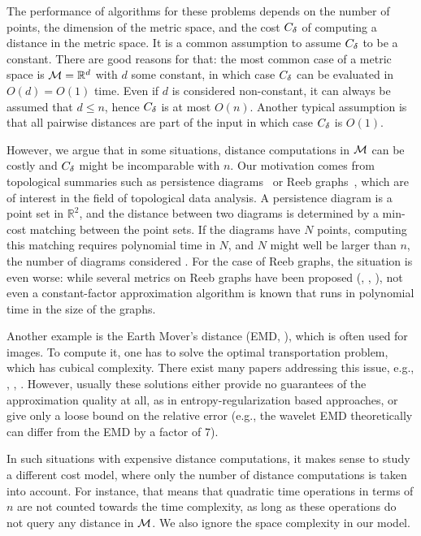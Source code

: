 \documentclass[]{ws-ijcga}
\renewcommand{\leq}{\leqslant}
\newcommand{\RR}{\mathbb{R}}
\begin{document}
The performance of algorithms for these problems depends on the number of points,
the dimension of the metric space, and the cost $C_{\delta}$ of computing a distance in the metric space.
It is a common assumption to assume $C_{\delta}$ to be a constant.
There are good reasons for that: the most common case of a metric space
is $\metricspace=\RR^d$ with $d$ some constant, in which case $C_{\delta}$ can be evaluated in $O(d)=O(1)$ time.
Even if $d$ is considered non-constant,
it can always be assumed that $d\leq n$, hence $C_{\delta}$ is at most $O(n)$.
Another typical assumption is that all pairwise distances are part of the input
in which case $C_{\delta}$ is $O(1)$.

However, we argue that in some situations, distance computations
in $\mathcal{M}$ can be costly and $C_{\delta}$ might be incomparable
with $n$. Our motivation comes from topological summaries
such as persistence diagrams~\cite{elz-topological} or Reeb graphs~\cite{reeb-survey}, which are of interest
in the field of topological data analysis. A persistence diagram
is a point set in $\RR^2$, and the distance between two diagrams
is determined by a min-cost matching between the point sets.
If the diagrams have $N$ points, computing this matching requires
polynomial time in $N$, and $N$ might well be larger than $n$, the number
of diagrams considered \cite{cohen2007stability}. For the case of Reeb graphs, the situation is even
worse: while several metrics on Reeb graphs have been proposed (\cite{bauer2014measuring}, \cite{de2016categorified},
\cite{di2016edit}),
not even a constant-factor approximation algorithm is known that runs
in polynomial time in the size of the graphs.


Another example is the Earth Mover's distance (EMD, \cite{rubner2000earth}), which
is often used for images.
To compute it, one has to solve the optimal
transportation problem, which has cubical complexity. There exist many papers addressing this issue,
e.g., \cite{wemd}, \cite{grounded_emd}, \cite{entropy_emd}.
However, usually these solutions either provide no guarantees of the approximation
quality at all, as in entropy-regularization based approaches,
or give only a loose bound on the relative error (e.g., the wavelet EMD \cite{wemd}
theoretically can differ from the EMD by a factor of 7).



In such situations with expensive distance computations,
it makes sense to study a different cost model, where only the number of distance computations
is taken into account. For instance, that means that quadratic time operations in terms of $n$
are not counted towards the time complexity, as long as these operations do not query any distance
in $\mathcal{M}$. We also ignore the space complexity in our model.
\end{document}
